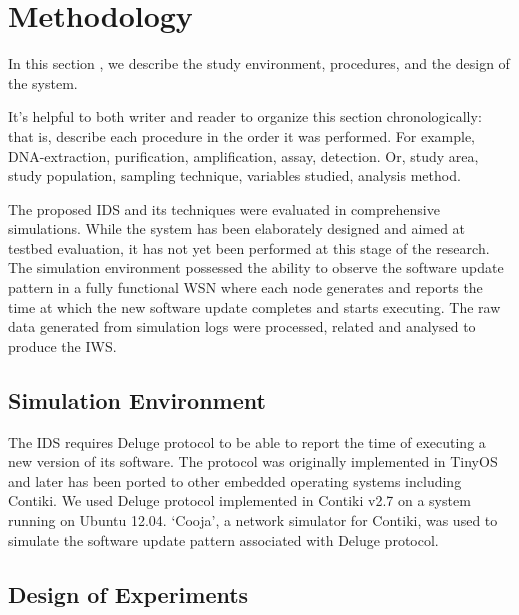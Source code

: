 \documentclass[conference,final]{IEEEtran}
\begin{document}
\section{Methodology}
\label{sec:meth}
In this section , we describe the study environment, procedures, and the design of the system.

It's helpful to both writer and reader to organize this section chronologically: that is, describe each procedure in the order it was performed. For example, DNA-extraction, purification, amplification, assay, detection. Or, study area, study population, sampling technique, variables studied, analysis method.

The proposed IDS and its techniques were evaluated in comprehensive simulations.
While the system has been elaborately designed and aimed at testbed evaluation, it has not yet been performed at this stage of the research. 
The simulation environment possessed the ability to observe the software update pattern in a fully functional WSN where each node generates and reports the time at which the new software update completes and starts executing.
The raw data generated from simulation logs were processed, related and  analysed to produce the IWS.

\subsection*{Simulation Environment}
\label{subsec:sim_env}
The IDS requires Deluge protocol to be able to report the time of executing  a new version of its software.
The protocol was originally implemented in TinyOS and later has been ported to other embedded operating systems including Contiki. 
We used Deluge protocol implemented in Contiki v2.7 on a system running on Ubuntu 12.04.
`Cooja', a network simulator for Contiki, was used to simulate the software update pattern associated with Deluge protocol. 

\subsection*{Design of Experiments}
\label{subsec:exp_des}
\end{document}
